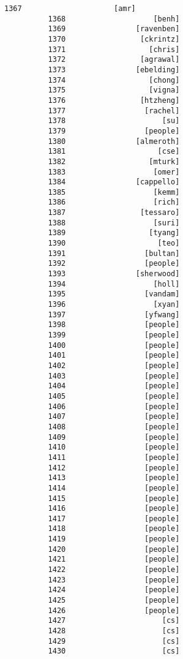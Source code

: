 \documentclass[11pt]{article}
\begin{document}
\begin{Verbatim}[commandchars=\\\{\}]
          1367                     [amr]
          1368                    [benh]
          1369                [ravenben]
          1370                 [ckrintz]
          1371                   [chris]
          1372                 [agrawal]
          1373                [ebelding]
          1374                   [chong]
          1375                   [vigna]
          1376                 [htzheng]
          1377                  [rachel]
          1378                      [su]
          1379                  [people]
          1380                [almeroth]
          1381                     [cse]
          1382                   [mturk]
          1383                    [omer]
          1384                [cappello]
          1385                    [kemm]
          1386                    [rich]
          1387                 [tessaro]
          1388                    [suri]
          1389                   [tyang]
          1390                     [teo]
          1391                  [bultan]
          1392                  [people]
          1393                [sherwood]
          1394                    [holl]
          1395                  [vandam]
          1396                    [xyan]
          1397                  [yfwang]
          1398                  [people]
          1399                  [people]
          1400                  [people]
          1401                  [people]
          1402                  [people]
          1403                  [people]
          1404                  [people]
          1405                  [people]
          1406                  [people]
          1407                  [people]
          1408                  [people]
          1409                  [people]
          1410                  [people]
          1411                  [people]
          1412                  [people]
          1413                  [people]
          1414                  [people]
          1415                  [people]
          1416                  [people]
          1417                  [people]
          1418                  [people]
          1419                  [people]
          1420                  [people]
          1421                  [people]
          1422                  [people]
          1423                  [people]
          1424                  [people]
          1425                  [people]
          1426                  [people]
          1427                      [cs]
          1428                      [cs]
          1429                      [cs]
          1430                      [cs]

\end{Verbatim}
\end{document}
